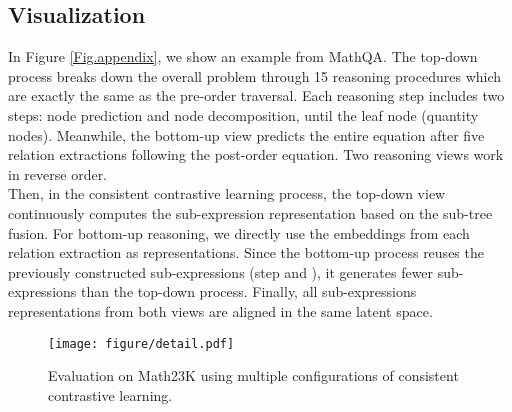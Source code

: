 \documentclass[11pt]{article}
\begin{document}
\subsection{Visualization}
In Figure \ref{Fig.appendix}, we show an example from MathQA. The top-down process breaks down the overall problem through 15 reasoning procedures which are exactly the same as the pre-order traversal. Each reasoning step includes two steps:  node prediction and node decomposition, until the leaf node (quantity nodes). Meanwhile, the bottom-up view predicts the entire equation after five relation extractions following the post-order equation. Two reasoning views work in reverse order.\\ 
\indent Then, in the consistent contrastive learning process, the top-down view continuously computes the sub-expression representation based on the sub-tree fusion. For bottom-up reasoning, we directly use the embeddings from each relation extraction as representations. Since the bottom-up process reuses the previously constructed sub-expressions (step  and ), it generates fewer sub-expressions than the top-down process. Finally, all sub-expressions representations from both views are aligned in the same latent space.\\
\begin{figure}[t]
\begin{center}
\texttt{[image: figure/detail.pdf]}
\end{center}
\caption{Evaluation on Math23K using multiple configurations of consistent contrastive learning.}
\label{detail}
\end{figure}
\end{document}
